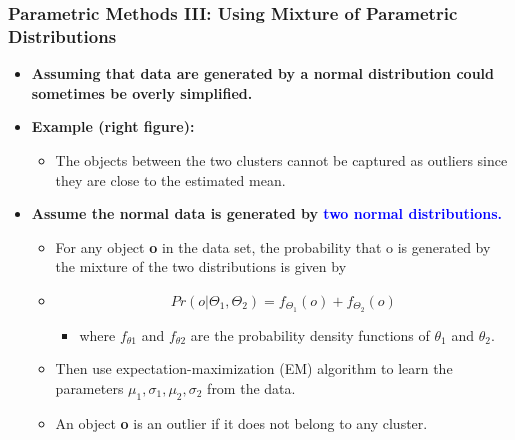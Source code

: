 \documentclass[aspectratio=169,t,xcolor=dvipsnames]{beamer}
\newcommand{\blue}[1]{\textbf{\textcolor{blue}{#1}}}
\begin{document}
\begin{frame}
	\frametitle{Parametric Methods III: Using Mixture of Parametric Distributions}
	\begin{itemize}
		\item \textbf{Assuming that data are generated by a normal distribution could sometimes be overly simplified.}
		\item \textbf{Example (right figure):}
		      \begin{itemize}
		      	\item The objects between the two clusters cannot be captured as outliers since they are close to the estimated mean.
		      \end{itemize}
		\item \textbf{Assume the normal data is generated by \blue{two normal distributions.}}
		      \begin{itemize}
		      	\item For any object \textbf{\alert{o}} in the data set, the probability that o is generated by the mixture of the two distributions is given by
		      	\item $$Pr(o|\Theta_1, \Theta_2) = f_{\Theta_1}(o) + f_{\Theta_2}(o)$$
		      	
		      	      \begin{itemize}
		      	      	\item where $f_{\theta 1}$ and $f_{\theta 2}$ are the probability density functions of $\theta_1$ and $\theta_2$.
		      	      \end{itemize}
		      	\item Then use expectation-maximization (EM) algorithm to learn the parameters $\mu_1, \sigma_1, \mu_2, \sigma_2$ from the data.
		      	\item An object \textbf{o} is an outlier if it does not belong to any cluster.
		      \end{itemize}
	\end{itemize}
\end{frame}

%
\end{document}
